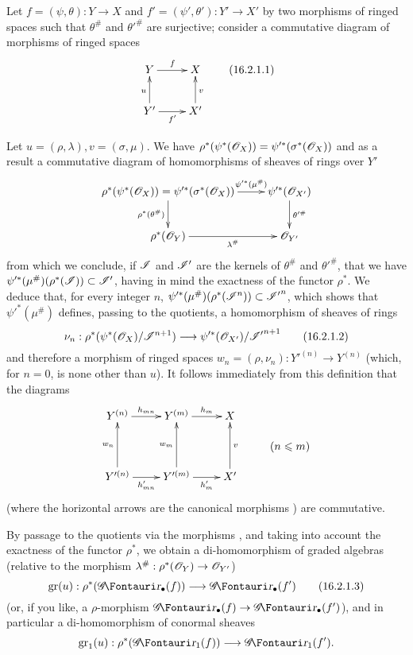 \begin{env}[16.2.1]
\label{IV.16.2.1}
Let $f = (\psi, \theta): Y \to X$ and $f' = (\psi', \theta'): Y' \to X'$ by two morphisms of ringed spaces such that $\theta^\#$ and $\theta'^\#$ are surjective;
consider a commutative diagram of morphisms of ringed spaces
\[
  \label{IV.16.2.1.1}
  \xymatrix{
    Y \ar[r]^f & X \\
    Y'\ar[r]_{f'} \ar[u]^u & X'\ar[u]_v  
  }
  \tag{16.2.1.1}
\]

Let $u = (\rho, \lambda), v = (\sigma, \mu)$. 
We have $\rho^*(\psi^*(\mathscr{O}_X)) = \psi'^*(\sigma^*(\mathscr{O}_X))$ and as a result a commutative diagram of homomorphisms of sheaves of rings over $Y'$
\[
  \xymatrix{
    \rho^*(\psi^*(\sh{O}_X)) = \psi'^*(\sigma^*(\sh{O}_X)) \ar[r]^-{\psi'^*(\mu^\#)}\ar[d]_{\rho^*(\theta^\#)} & \psi'^*(\sh{O}_{X'}) \ar[d]^{\theta'^\#} \\
    \rho^*(\sh{O}_Y)\ar[r]_-{\lambda^\#}  & \sh{O}_{Y'}  
  }
\]
from which we conclude, if $\mathscr{I}$ and $\mathscr{I'}$ are the kernels of $\theta^\#$ and $\theta'^\#$, that we have $\psi'^*(\mu^\#)(\rho^*(\mathscr{I})) \subset \mathscr{I'}$, having in mind the exactness of the functor $\rho^*$.
We deduce that, for every integer $n$, $\psi'^*(\mu^\#)(\rho^*(\mathscr{I}^n)) \subset \mathscr{I'}^n$, which shows that $\psi'^*(\mu^\#)$ defines, passing to the quotients, a homomorphism of sheaves of rings
\[
  \label{IV.16.2.1.2}
  \nu_n: \rho^*(\psi^*(\sh{O}_X)/\sh{I}^{n+1}) \to \psi'^*(\sh{O}_{X'})/\sh{I'}^{n+1}
  \tag{16.2.1.2}
\]
and therefore a morphism of ringed spaces $w_n = (\rho, \nu_n): Y'^{(n)} \to Y^{(n)}$ (which, for $n = 0$, is none other than $u$).
It follows immediately from this definition that the diagrams
\[
  \xymatrix@R=1pc{
    Y^{(n)} \ar[r]^-{h_{mn}} & Y^{(m)} \ar[r]^-{h_m} & X \\
    & & & (n \leq m) \\
    Y'^{(n)} \ar[r]_-{h'_{mn}} \ar[uu]^-{w_n} & Y'^{(m)} \ar[r]_-{h'_m} \ar[uu]^-{w_m} & X' \ar[uu]_-v \\
  }
\]
(where the horizontal arrows are the canonical morphisms ) are commutative.

By passage to the quotients via the morphisms , and taking into
account the exactness of the functor $\rho^*$, we obtain a di-homomorphism of graded algebras (relative to the morphism $\lambda^\#: \rho^*(\sh{O}_Y) \to \sh{O}_{Y'}$)
\[
  \label{IV.16.2.1.3}
  \gr(u): \rho^*(\shGr_\bullet(f)) \to \shGr_\bullet(f')
  \tag{16.2.1.3}
\]
(or, if you like, a $\rho$-morphism  $\shGr_\bullet(f) \to \shGr_\bullet(f')$), and in particular a di-homomorphism of conormal sheaves
\[
  \gr_1(u): \rho^*(\shGr_1(f)) \to \shGr_1(f').
\]


\end{env}
